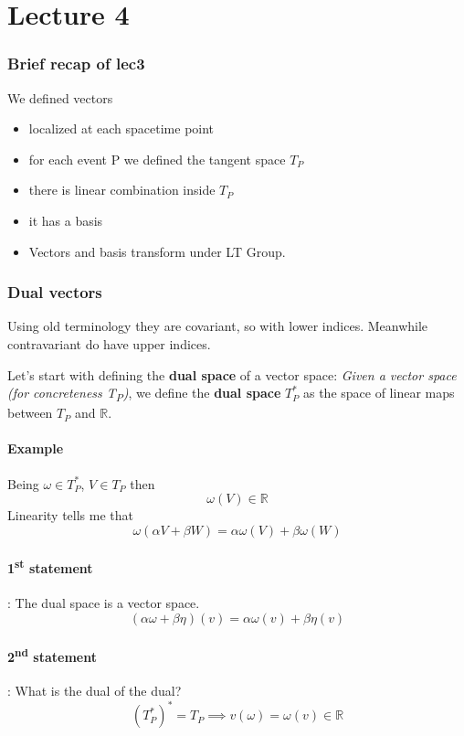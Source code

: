 \section{Lecture 4}

\subsubsection{Brief recap of lec3}
We defined vectors
\begin{itemize}
	\item localized at each spacetime point
	\item for each event P we defined the tangent space $T_{P}$
	\item there is linear combination inside $T_{P}$
	\item it has a basis
	\item Vectors and basis transform under LT Group.
\end{itemize}

\subsubsection{Dual vectors}
Using old terminology they are covariant, so with lower indices. Meanwhile contravariant do have upper indices.

Let's start with defining the \textbf{dual space} of a vector space:
\emph{Given a vector space (for concreteness T\textsubscript{P})}, we define the \textbf{dual space} $T_{P}^{*}$ as the space of linear maps between $T_{P}$ and $\mathbb{R}$.

\paragraph{Example}
Being $\omega  \in T_{P}^{*}$, $V \in T_{P}$ then
\[
	\omega \left( V \right) \in \mathbb{R}
\]
Linearity tells me that 
\[
\omega \left( \alpha V + \beta  W \right) = \alpha \omega \left( V \right) + \beta \omega \left( W \right)
\]

\paragraph{1\textsuperscript{st} statement}: The dual space is a vector space.
\[
	\left( \alpha \omega  + \beta \eta  \right)\left( v \right) = \alpha \omega \left( v \right) + \beta \eta \left( v \right)
\]
\paragraph{2\textsuperscript{nd} statement}: What is the dual of the dual?
\[
	\left( T_{P}^{*} \right)^{*} = T_{P} \implies v\left( \omega  \right) = \omega \left( v \right) \in \mathbb{R}
\]

